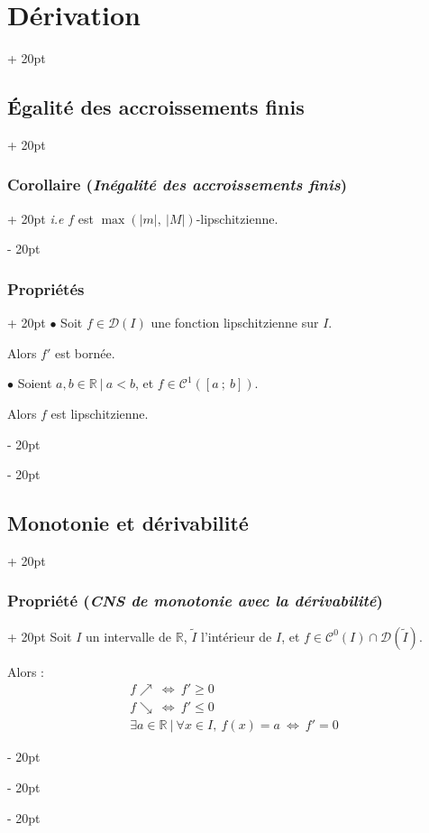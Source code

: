 \documentclass[a4paper, 12pt, twoside]{article}
\newcommand{\R}{\mathbb{R}} %
\newcommand{\seg}[2]{\left[ #1\ ;\ #2 \right]}
\newcommand{\lr}[1]{\left( #1 \right)}
\newcommand{\abs}[1]{\left\lvert #1 \right\rvert}
\newcommand{\ssi}{\ \Leftrightarrow \ }
\renewcommand{\le}{\leqslant}
\renewcommand{\ge}{\geqslant}
\newcommand{\ind}[1][20pt]{\advance\leftskip + #1}
\newcommand{\deind}[1][20pt]{\advance\leftskip - #1}
\newenvironment{indt}[2][20pt]{#2 \par \ind[#1]}{\par \deind} %
\begin{document}
\begin{indt}{\section{Dérivation}}
\begin{indt}{\subsection{\'Egalité des accroissements finis}}
\begin{indt}{\subsubsection{Corollaire (\textit{Inégalité des accroissements finis})}}
                \textit{i.e} $f$ est $\max\!\lr{\abs m,\ \abs M}$-lipschitzienne.
            \end{indt}

            \vspace{12pt}
            
            \begin{indt}{\subsubsection{Propriétés}}
                $\bullet$ Soit $f \in \mathcal D(I)$ une fonction lipschitzienne sur $I$.

                Alors $f'$ est bornée.

                \vspace{12pt}
                
                $\bullet$ Soient $a, b \in \R\ |\ a < b$, et $f \in \mathcal C^1(\seg a b)$.

                Alors $f$ est lipschitzienne.
            \end{indt}
        \end{indt}

        \vspace{12pt}
        
        \begin{indt}{\subsection{Monotonie et dérivabilité}}
            \begin{indt}{\subsubsection{Propriété (\textit{CNS de monotonie avec la dérivabilité})}}
                Soit $I$ un intervalle de $\R$, $\widetilde I$ l'intérieur de $I$, et $f \in \mathcal C^0(I) \cap \mathcal D\!\lr{\widetilde I}$.

                Alors :
                \[
                    \begin{array}{c}
                        f \nearrow \ssi f' \ge 0
                        \\
                        f \searrow \ssi f' \le 0
                        \\
                        \exists a \in \R\ |\ \forall x \in I,\ f(x) = a \ssi f' = 0
                    \end{array}
                \]
            \end{indt}


\end{indt}
\end{indt}
\end{document}
